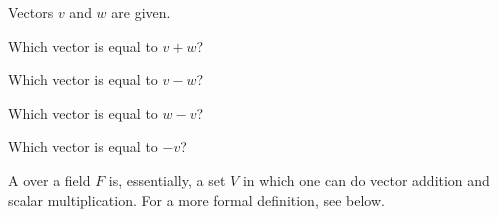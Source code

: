 \endedxtext






Vectors $v$ and $w$ are given.  

\begin{center}

\end{center}

Which vector is equal to $v+w$?    



Which vector is equal to $v-w$?    


Which vector is equal to $w-v$?    


Which vector is equal to $-v$?    


\edXsolution{  }

\endedxproblem


\endedxvertical




\endedxvertical




A {} over a field $F$ is, essentially, a set $V$ in which one can 
do vector addition and scalar multiplication.  For a more formal definition, see below. 

